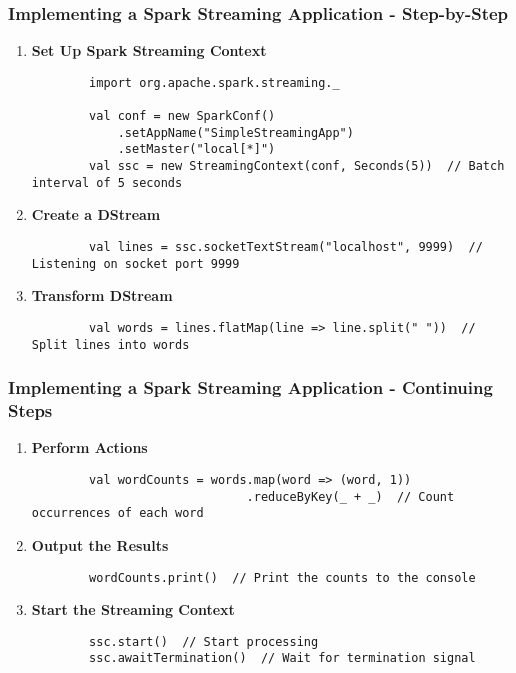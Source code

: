 \documentclass[aspectratio=169]{beamer}
\begin{document}
\begin{frame}[fragile]
    \frametitle{Implementing a Spark Streaming Application - Step-by-Step}
    \begin{enumerate}
        \item \textbf{Set Up Spark Streaming Context}
        \begin{lstlisting}
        import org.apache.spark.streaming._

        val conf = new SparkConf()
            .setAppName("SimpleStreamingApp")
            .setMaster("local[*]")
        val ssc = new StreamingContext(conf, Seconds(5))  // Batch interval of 5 seconds
        \end{lstlisting}

        \item \textbf{Create a DStream}
        \begin{lstlisting}
        val lines = ssc.socketTextStream("localhost", 9999)  // Listening on socket port 9999
        \end{lstlisting}

        \item \textbf{Transform DStream}
        \begin{lstlisting}
        val words = lines.flatMap(line => line.split(" "))  // Split lines into words
        \end{lstlisting}
    \end{enumerate}
\end{frame}

\begin{frame}[fragile]
    \frametitle{Implementing a Spark Streaming Application - Continuing Steps}
    \begin{enumerate}[resume]
        \item \textbf{Perform Actions}
        \begin{lstlisting}
        val wordCounts = words.map(word => (word, 1))
                              .reduceByKey(_ + _)  // Count occurrences of each word
        \end{lstlisting}

        \item \textbf{Output the Results}
        \begin{lstlisting}
        wordCounts.print()  // Print the counts to the console
        \end{lstlisting}

        \item \textbf{Start the Streaming Context}
        \begin{lstlisting}
        ssc.start()  // Start processing
        ssc.awaitTermination()  // Wait for termination signal
        \end{lstlisting}
    \end{enumerate}
\end{frame}
\end{document}
